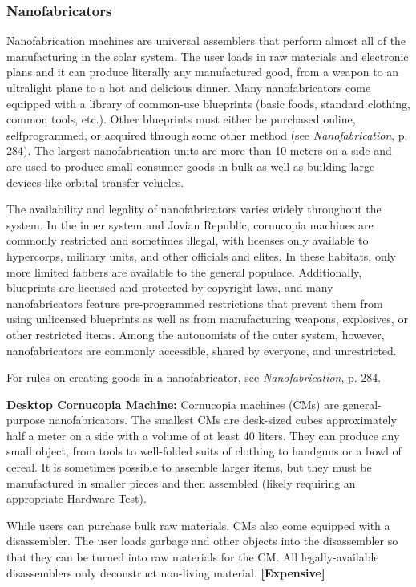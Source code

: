 \subsubsection{Nanofabricators}

Nanofabrication machines are universal assemblers that perform almost all of the manufacturing in the solar system. The user loads in raw materials and electronic plans and it can produce literally any manufactured good, from a weapon to an ultralight plane to a hot and delicious dinner. Many nanofabricators come equipped with a library of common-use blueprints (basic foods, standard clothing, common tools, etc.). Other blueprints must either be purchased online, selfprogrammed, or acquired through some other method (see \emph{Nanofabrication}, p. 284). The largest nanofabrication units are more than 10 meters on a side and are used to produce small consumer goods in bulk as well as building large devices like orbital transfer vehicles.

The availability and legality of nanofabricators varies widely throughout the system. In the inner system and Jovian Republic, cornucopia machines are commonly restricted and sometimes illegal, with licenses only available to hypercorps, military units, and other officials and elites. In these habitats, only more limited fabbers are available to the general populace. Additionally, blueprints are licensed and protected by copyright laws, and many nanofabricators feature pre-programmed restrictions that prevent them from using unlicensed blueprints as well as from manufacturing weapons, explosives, or other restricted items. Among the autonomists of the outer system, however, nanofabricators are commonly accessible, shared by everyone, and unrestricted.

For rules on creating goods in a nanofabricator, see \textit{Nanofabrication}, p. 284.

\textbf{Desktop Cornucopia Machine:} Cornucopia machines (CMs) are general-purpose nanofabricators. The smallest CMs are desk-sized cubes approximately half a meter on a side with a volume of at least 40 liters. They can produce any small object, from tools to well-folded suits of clothing to handguns or a bowl of cereal. It is sometimes possible to assemble larger items, but they must be manufactured in smaller pieces and then assembled (likely requiring an appropriate Hardware Test).

While users can purchase bulk raw materials, CMs also come equipped with a disassembler. The user loads garbage and other objects into the disassembler so that they can be turned into raw materials for the CM. All legally-available disassemblers only deconstruct non-living material. \textbf{[Expensive]}


